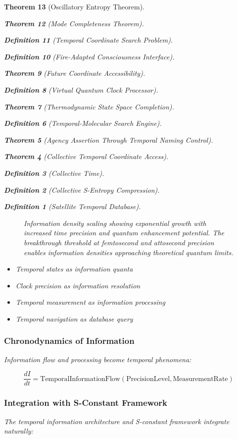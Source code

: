 \documentclass[12pt,a4paper]{article}
\newtheorem{theorem}{Theorem}[section]
\newtheorem{definition}[theorem]{Definition}
\begin{document}
\begin{theorem}[Oscillatory Entropy Theorem]
\begin{theorem}[Mode Completeness Theorem]
\begin{enumerate}
\begin{definition}[Temporal Coordinate Search Problem]
\begin{algorithm}
\begin{definition}[Fire-Adapted Consciousness Interface]
\begin{theorem}[Future Coordinate Accessibility]
\begin{definition}[Virtual Quantum Clock Processor]
\begin{itemize}
\begin{itemize}
\begin{theorem}[Thermodynamic State Space Completion]
\begin{definition}[Temporal-Molecular Search Engine]
\begin{theorem}[Agency Assertion Through Temporal Naming Control]
\begin{remark}
\begin{theorem}[Collective Temporal Coordinate Access]
\begin{definition}[Collective Time]
\begin{definition}[Collective S-Entropy Compression]
\begin{definition}[Satellite Temporal Database]
\begin{algorithm}
\begin{table}[h]
{{\begin{figure}[H]
\begin{tikzpicture}[scale=0.8]
\begin{axis}
\end{axis}
\end{tikzpicture}
\caption{Information density scaling showing exponential growth with increased time precision and quantum enhancement potential. The breakthrough threshold at femtosecond and attosecond precision enables information densities approaching theoretical quantum limits.}
\label{fig:information_density_scaling}
\end{figure}

\begin{itemize}
\item Temporal states as information quanta
\item Clock precision as information resolution
\item Temporal measurement as information processing
\item Temporal navigation as database query
\end{itemize}

\subsubsection{Chronodynamics of Information}

Information flow and processing become temporal phenomena:

\begin{equation}
\frac{dI}{dt} = \text{TemporalInformationFlow}(\text{PrecisionLevel}, \text{MeasurementRate})
\end{equation}

\subsubsection{Integration with S-Constant Framework}

The temporal information architecture and S-constant framework integrate naturally:

}}
\end{table}
\end{algorithm}
\end{definition}
\end{definition}
\end{definition}
\end{theorem}
\end{remark}
\end{theorem}
\end{definition}
\end{theorem}
\end{itemize}
\end{itemize}
\end{definition}
\end{theorem}
\end{definition}
\end{algorithm}
\end{definition}
\end{enumerate}
\end{theorem}
\end{theorem}
\end{document}
